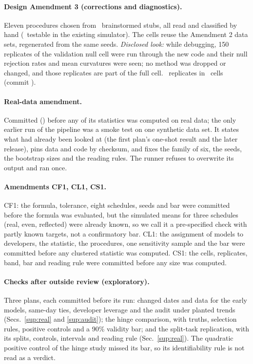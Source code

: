 \documentclass[aps,pre,twocolumn,superscriptaddress,nofootinbib,9pt]{revtex4-2}
\begin{document}
\paragraph*{Design Amendment 3 (corrections and diagnostics).} Eleven procedures chosen from \triN\ brainstormed stubs, all read and classified by hand (\triA\ testable in the existing simulator). The cells reuse the Amendment 2 data sets, regenerated from the same seeds. \emph{Disclosed look:} while debugging, 150 replicates of the validation null cell were run through the new code and their null rejection rates and mean curvatures were seen; no method was dropped or changed, and those replicates are part of the full cell. \aThreeReps\ replicates in \aThreeCells\ cells (commit \preregAThree).

\paragraph*{Real-data amendment.} Committed (\preregReal) before any of its statistics was computed on real data; the only earlier run of the pipeline was a smoke test on one synthetic data set. It states what had already been looked at (the first plan's one-shot result and the later release), pins data and code by checksum, and fixes the family of six, the seeds, the bootstrap sizes and the reading rules. The runner refuses to overwrite its output and ran once.

\paragraph*{Amendments CF1, CL1, CS1.} CF1: the formula, tolerance, eight schedules, seeds and bar were committed before the formula was evaluated, but the simulated means for three schedules (real, even, reflected) were already known, so we call it a pre-specified check with partly known targets, not a confirmatory bar. CL1: the assignment of models to developers, the statistic, the procedures, one sensitivity sample and the bar were committed before any clustered statistic was computed. CS1: the cells, replicates, band, bar and reading rule were committed before any size was computed.

\paragraph*{Checks after outside review (exploratory).} Three plans, each committed before its run: changed dates and data for the early models, same-day ties, developer leverage and the audit under planted trends (Secs.~\ref{sup:real} and \ref{sup:audit}); the hinge comparison, with truths, selection rules, positive controls and a 90\% validity bar; and the split-task replication, with its splits, controls, intervals and reading rule (Sec.~\ref{sup:real}). The quadratic positive control of the hinge study missed its bar, so its identifiability rule is not read as a verdict.
\end{document}
